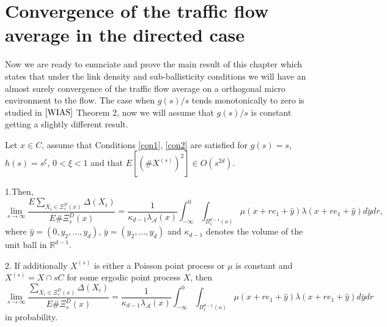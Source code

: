 \section{Convergence of the traffic flow average in the directed case} 
Now we are ready to enunciate and prove the main result of this chapter which states that under the link density and sub-ballisticity conditions we will have an almost surely convergence of the traffic flow average on a orthogonal micro environment to the flow.
The case when $g(s)/s$ tends monotonically to zero is studied in $\cite{WIAS}$ Theorem 2, now we will assume that $g(s)/s$ is constant getting a slightly different result.
  
\begin{thm}\label{thm2.1} Let $x\in C$, assume that Conditions \ref{con1}, \ref{con2} are satisfied for $g(s)=s$, $h(s)=s^\xi$,  $0<\xi<1$ and that $E[(\#X^{(s)})^2]\in O(s^{2d})$. 

1.Then, \small $$\lim_{s\rightarrow \infty}\frac{E\sum_{X_i\in\Xi^D_s(x)}\Delta(X_i)}{E\#\Xi^D_s(x)}=\frac{1}{\kappa_{d-1}\lambda_\mathcal{A}(x)}\int_{-\infty}^0\int_{B^{d-1}_{1}(o)}\mu(x+re_1+\hat{y})\lambda(x+re_1+\hat{y})d\bar{y}dr, $$\normalsize where $\hat{y}=(0, y_2, ...,y_d)$, $\bar{y}=(y_2, ...,y_d)$ and $\kappa_{d-1}$ denotes the volume of the unit ball in $\mathbb{R}^{d-1}$.

2. If additionally $X^{(s)}$ is either a Poisson point process or $\mu$ is constant and $X^{(s)}=X\cap sC$ for some ergodic point process $X$, then \small $$\lim_{s\rightarrow \infty}\frac{\sum_{X_i\in\Xi^D_s(x)}\Delta(X_i)}{E\#\Xi^D_s(x)}=\frac{1}{\kappa_{d-1}\lambda_\mathcal{A}(x)}\int_{-\infty}^0\int_{B^{d-1}_{1}(o)}\mu(x+re_1+\hat{y})\lambda(x+re_1+\hat{y})d\bar{y}dr$$\normalsize in probability.

\end{thm} 
 
